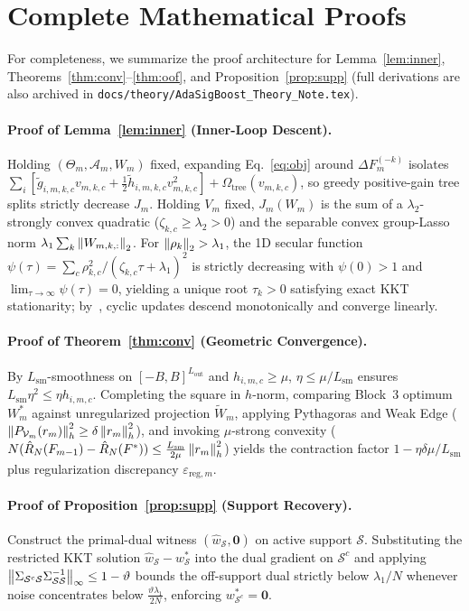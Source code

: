 \section{Complete Mathematical Proofs}
\label{app:proofs}
For completeness, we summarize the proof architecture for Lemma~\ref{lem:inner}, Theorems~\ref{thm:conv}--\ref{thm:oof}, and Proposition~\ref{prop:supp} (full derivations are also archived in \texttt{docs/theory/AdaSigBoost\_Theory\_Note.tex}).

\paragraph{Proof of Lemma~\ref{lem:inner} (Inner-Loop Descent).}
Holding $(\Theta_m, \mathcal{A}_m, W_m)$ fixed, expanding Eq.~\eqref{eq:obj} around $\Delta F_m^{(-k)}$ isolates $\sum_i [\tilde{g}_{i,m,k,c} v_{m,k,c} + \frac{1}{2}\tilde{h}_{i,m,k,c} v_{m,k,c}^2] + \Omega_{\mathrm{tree}}(v_{m,k,c})$, so greedy positive-gain tree splits strictly decrease $J_m$. Holding $V_m$ fixed, $J_m(W_m)$ is the sum of a $\lambda_2$-strongly convex quadratic ($\zeta_{k,c} \ge \lambda_2 > 0$) and the separable convex group-Lasso norm $\lambda_1 \sum_k \left\lVert W_{m,k,:} \right\rVert_2$. For $\left\lVert \rho_k \right\rVert_2 > \lambda_1$, the 1D secular function $\psi(\tau) = \sum_c \rho_{k,c}^2 / (\zeta_{k,c}\tau + \lambda_1)^2$ is strictly decreasing with $\psi(0) > 1$ and $\lim_{\tau\to\infty}\psi(\tau)=0$, yielding a unique root $\tau_k > 0$ satisfying exact KKT stationarity; by~\citet{tseng2001convergence}, cyclic updates descend monotonically and converge linearly.

\paragraph{Proof of Theorem~\ref{thm:conv} (Geometric Convergence).}
By $L_{\mathrm{sm}}$-smoothness on $[-B,B]^{L_{\mathrm{out}}}$ and $h_{i,m,c} \ge \mu$, $\eta \le \mu/L_{\mathrm{sm}}$ ensures $L_{\mathrm{sm}}\eta^2 \le \eta h_{i,m,c}$. Completing the square in $h$-norm, comparing Block~3 optimum $W_m^*$ against unregularized projection $\tilde{W}_m$, applying Pythagoras and Weak Edge ($\left\lVert P_{\mathcal{V}_m}(r_m) \right\rVert_h^2 \ge \delta\left\lVert r_m \right\rVert_h^2$), and invoking $\mu$-strong convexity ($N(\hat{R}_N(F_{m-1}) - \hat{R}_N(F^*)) \le \frac{L_{\mathrm{sm}}}{2\mu}\left\lVert r_m \right\rVert_h^2$) yields the contraction factor $1 - \eta\delta\mu/L_{\mathrm{sm}}$ plus regularization discrepancy $\varepsilon_{\mathrm{reg},m}$.

\paragraph{Proof of Proposition~\ref{prop:supp} (Support Recovery).}
Construct the primal-dual witness $(\hat{w}_{\mathcal{S}}, \mathbf{0})$ on active support $\mathcal{S}$. Substituting the restricted KKT solution $\hat{w}_{\mathcal{S}} - w_{\mathcal{S}}^*$ into the dual gradient on $\mathcal{S}^c$ and applying $\left\lVert \Sigma_{\mathcal{S}^c\mathcal{S}}\Sigma_{\mathcal{S}\mathcal{S}}^{-1} \right\rVert_\infty \le 1-\vartheta$ bounds the off-support dual strictly below $\lambda_1/N$ whenever noise concentrates below $\frac{\vartheta\lambda_1}{2N}$, enforcing $w_{\mathcal{S}^c}^* = \mathbf{0}$.

